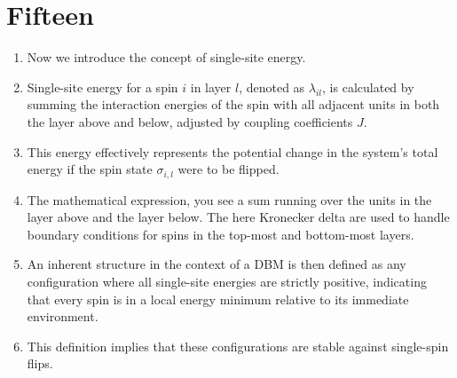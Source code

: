 \documentclass{article}
\begin{document}
\section*{Fifteen}
\begin{enumerate}
    \item Now we introduce the concept of single-site energy.
    \item Single-site energy for a spin \( i \) in layer \( l \), denoted as \( \lambda_{il} \), is calculated by summing the interaction energies of the spin with all adjacent units in both the layer above and below, adjusted by coupling coefficients \( J \).
    \item This energy effectively represents the potential change in the system's total energy if the spin state \( \sigma_{i,l} \) were to be flipped.
    \item The mathematical expression, you see a sum running over the units in the layer above and the layer below. The here Kronecker delta are used to handle boundary conditions for spins in the top-most and bottom-most layers.
    \item An inherent structure in the context of a DBM is then defined as any configuration where all single-site energies are strictly positive, indicating that every spin is in a local energy minimum relative to its immediate environment.
    \item This definition implies that these configurations are stable against single-spin flips.
\end{enumerate}
\end{document}
